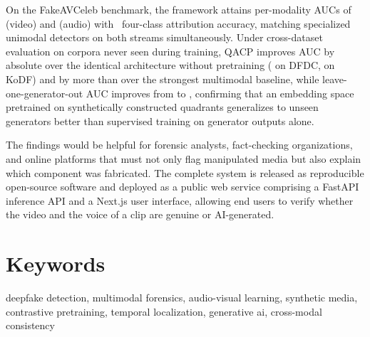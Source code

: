 On the FakeAVCeleb benchmark, the framework attains per-modality AUCs of
 (video) and  (audio) with
~four-class attribution accuracy, matching specialized
unimodal detectors on both streams simultaneously. Under cross-dataset
evaluation on corpora never seen during training, QACP improves AUC by
 absolute over the identical architecture without pretraining
( on DFDC,  on KoDF) and by more than
 over the strongest multimodal baseline, while
leave-one-generator-out AUC improves from  to ,
confirming that an embedding space pretrained on synthetically constructed
quadrants generalizes to unseen generators better than supervised training
on generator outputs alone.

The findings would be helpful for forensic analysts, fact-checking
organizations, and online platforms that must not only flag manipulated media
but also explain which component was fabricated. The complete system is
released as reproducible open-source software and deployed as a public web
service comprising a FastAPI inference API and a Next.js user interface,
allowing end users to verify whether the video and the voice of a clip are
genuine or AI-generated.

\chapter*{Keywords}

deepfake detection, multimodal forensics, audio-visual learning, synthetic
media, contrastive pretraining, temporal localization, generative ai,
cross-modal consistency

\clearpage
